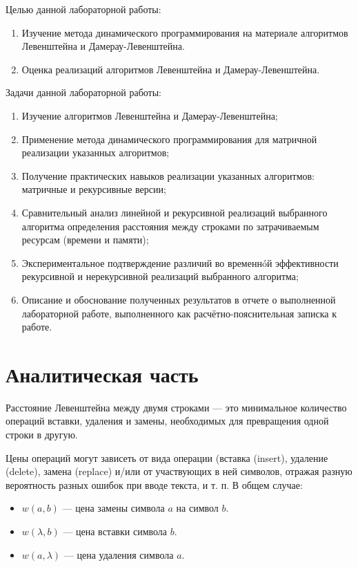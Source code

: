 \documentclass[12pt]{report}
\begin{document}
Целью данной лабораторной работы: 
\begin{enumerate}
	\item Изучение метода динамического программирования на материале алгоритмов Левенштейна и Дамерау-Левенштейна.
	\item Оценка реализаций алгоритмов Левенштейна и Дамерау-Левенштейна.
\end{enumerate}

Задачи данной лабораторной работы:
\begin{enumerate}
  	\item Изучение алгоритмов Левенштейна и Дамерау-Левенштейна;
	\item Применение метода динамического программирования для матричной реализации указанных алгоритмов; 
	\item Получение практических навыков реализации указанных алгоритмов: матричные и рекурсивные версии; 
	\item Сравнительный анализ линейной и рекурсивной реализаций выбранного алгоритма определения расстояния между строками по затрачиваемым ресурсам (времени и памяти); 
	\item Экспериментальное подтверждение различий во временнóй эффективности рекурсивной и
нерекурсивной реализаций выбранного алгоритма; 
	\item Описание и обоснование полученных результатов в отчете о выполненной лабораторной
работе, выполненного как расчётно-пояснительная записка к работе. 
\end{enumerate}


\chapter{Аналитическая часть}

Расстояние Левенштейна \cite{Levenshtein} между двумя строками — это минимальное количество операций вставки, удаления и замены, необходимых для превращения одной строки в другую.


Цены операций могут зависеть от вида операции (вставка (insert), удаление (delete), замена (replace) и/или от участвующих в ней символов, отражая разную вероятность разных ошибок при вводе текста, и т. п. В общем случае:

\begin{itemize}

	\item $w(a,b)$ — цена замены символа $a$ на символ $b$.

	\item $w(\lambda,b)$ — цена вставки символа $b$.

	\item $w(a,\lambda)$ — цена удаления символа $a$.

\end{itemize} 
\end{document}

